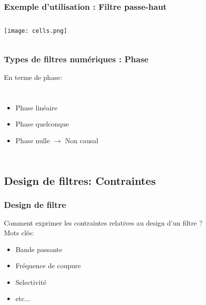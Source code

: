 \documentclass{beamer}
\begin{document}
\begin{frame}
\frametitle{Exemple d'utilisation : Filtre passe-haut}
\begin{columns}
\column{60mm}
\begin{center}
\texttt{[image: cells.png]}
\end{center}

\column{60mm}
\end{columns}
\vspace{1cm}

\end{frame}

\begin{frame}
\frametitle{Types de filtres numériques : Phase} 
En terme de phase:
\begin{columns}
\column{60mm} 
\begin{itemize}
\item<2-> Phase linéaire 
\vspace{0.6cm}

\item<4-> Phase quelconque 

\vspace{0.6cm}
\item<5-> Phase nulle  { $\rightarrow$ Non causal}
\end{itemize}

\column{60mm}

\end{columns}
\end{frame}



\subsection{Design de filtres: Contraintes}
\begin{frame}
\frametitle{Design de filtre}
Comment exprimer les contraintes relatives au design d'un filtre ?\\
\vspace{1cm}
Mots clés:
\begin{itemize}
\item<2->  Bande passante 
\vspace{0.3cm}
\item<3-> Fréquence de coupure
\vspace{0.3cm} 
\item<4->  Selectivité
\vspace{0.3cm}
\item<5-> etc...
\end{itemize}
\vspace{1cm}

\end{frame}
\end{document}
